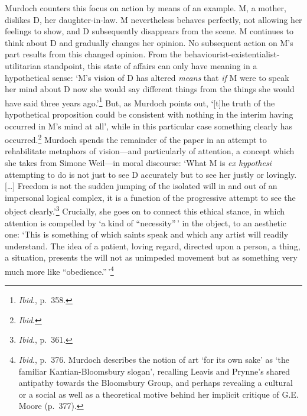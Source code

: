 \documentclass[]{article}
\begin{document}
Murdoch counters this focus on action by means of an example. M, a
mother, dislikes D, her daughter-in-law. M nevertheless behaves
perfectly, not allowing her feelings to show, and D subsequently
disappears from the scene. M continues to think about D and gradually
changes her opinion. No subsequent action on M's part results from this
changed opinion. From the behaviourist-existentialist-utilitarian
standpoint, this state of affairs can only have meaning in a
hypothetical sense: `M's vision of D has altered \emph{means} that
\emph{if} M were to speak her mind about D now she would say different
things from the things she would have said three years ago.'\footnote{\emph{Ibid}.,
  p.~358.} But, as Murdoch points out, `{[}t{]}he truth of the
hypothetical proposition could be consistent with nothing in the interim
having occurred in M's mind at all', while in this particular case
something clearly has occurred.\footnote{\emph{Ibid}.} Murdoch spends
the remainder of the paper in an attempt to rehabilitate metaphors of
vision---and particularly of attention, a concept which she takes from
Simone Weil---in moral discourse: `What M is \emph{ex hypothesi}
attempting to do is not just to see D accurately but to see her justly
or lovingly. {[}\ldots{}{]} Freedom is not the sudden jumping of the
isolated will in and out of an impersonal logical complex, it is a
function of the progressive attempt to see the object
clearly.'\footnote{\emph{Ibid}., p.~361.} Crucially, she goes on to
connect this ethical stance, in which attention is compelled by `a kind
of ``necessity''\,' in the object, to an aesthetic one: `This is
something of which saints speak and which any artist will readily
understand. The idea of a patient, loving regard, directed upon a
person, a thing, a situation, presents the will not as unimpeded
movement but as something very much more like
``obedience.''\,'\footnote{\emph{Ibid}., p.~376. Murdoch describes the
  notion of art `for its own sake' as `the familiar Kantian-Bloomsbury
  slogan', recalling Leavis and Prynne's shared antipathy towards the
  Bloomsbury Group, and perhaps revealing a cultural or a social as well
  as a theoretical motive behind her implicit critique of G.E. Moore
  (p.~377).}
\end{document}
